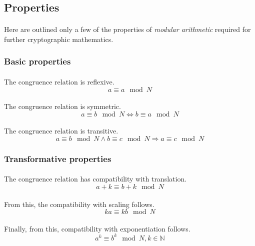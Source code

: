 \documentclass[a4paper, 10pt]{article}
\begin{document}
\subsection{Properties}
\paragraph*{}
Here are outlined only a few of the properties of \textit{modular arithmetic} required for further cryptographic 
mathematics.

\subsubsection{Basic properties}
\paragraph*{}
The congruence relation is reflexive.
$$a \equiv a \mod N$$

\paragraph*{}
The congruence relation is symmetric.
$$a \equiv b \mod N \Longleftrightarrow b \equiv a \mod N$$

\paragraph*{}
The congruence relation is transitive.
$$a \equiv b \mod N \land b \equiv c \mod N \Rightarrow a \equiv c \mod N$$

\subsubsection{Transformative properties} \label{mod-trans-props}
\paragraph*{}
The congruence relation has compatibility with translation.
$$a + k \equiv b + k \mod N$$

\paragraph*{}
From this, the compatibility with scaling follows.
$$ka \equiv kb \mod N$$

\paragraph*{}
Finally, from this, compatibility with exponentiation follows.
$$a^k \equiv b^k \mod N, k \in \mathbb{N}$$
\end{document}

